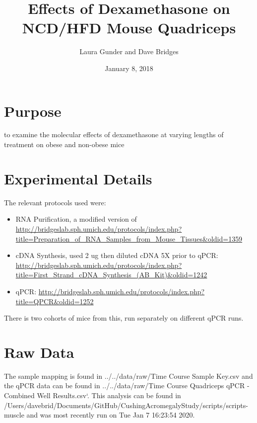\documentclass[]{article}
\title{Effects of Dexamethasone on NCD/HFD Mouse Quadriceps}
\author{Laura Gunder and Dave Bridges}
\date{January 8, 2018}
\providecommand{\tightlist}{%
  \setlength{\itemsep}{0pt}\setlength{\parskip}{0pt}}
\begin{document}
\maketitle

{
\setcounter{tocdepth}{2}
\tableofcontents
}
\section{Purpose}\label{purpose}

to examine the molecular effects of dexamethasone at varying lengths of
treatment on obese and non-obese mice

\section{Experimental Details}\label{experimental-details}

The relevant protocols used were:

\begin{itemize}
\tightlist
\item
  RNA Purification, a modified version of
  \url{http://bridgeslab.sph.umich.edu/protocols/index.php?title=Preparation_of_RNA_Samples_from_Mouse_Tissues\&oldid=1359}
\item
  cDNA Synthesis, used 2 ug then diluted cDNA 5X prior to qPCR:
  \url{http://bridgeslab.sph.umich.edu/protocols/index.php?title=First_Strand_cDNA_Synthesis_(AB_Kit)\&oldid=1242}
\item
  qPCR:
  \url{http://bridgeslab.sph.umich.edu/protocols/index.php?title=QPCR\&oldid=1252}
\end{itemize}

There is two cohorts of mice from this, run separately on different qPCR
runs.

\section{Raw Data}\label{raw-data}

The sample mapping is found in ../../data/raw/Time Course Sample Key.csv
and the qPCR data can be found in ../../data/raw/Time Course Quadriceps
qPCR - Combined Well Results.csv`. This analysis can be found in
/Users/davebrid/Documents/GitHub/CushingAcromegalyStudy/scripts/scripts-muscle
and was most recently run on Tue Jan 7 16:23:54 2020.
\end{document}
